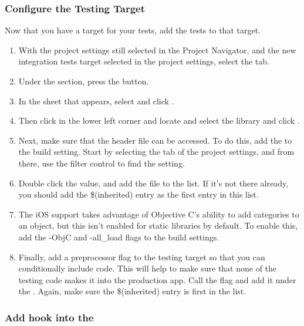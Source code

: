 \subsubsection{Configure the Testing Target}

Now that you have a target for your tests, add the tests to that target. 
\begin{enumerate}
\item  With the project settings still selected in the Project Navigator, and the new integration tests target selected in the project settings, select the  tab. 
\item Under the  section, press the \bxcaption{+} button. 
\item In the sheet that appears, select  and click .
\item Then click  in the lower left corner and locate and select the library  and click .
\item Next, make sure that the   header file can be accessed. To do this, add the  to the  
build setting. Start by selecting the  tab of the project settings, and from there, use the filter control to find the 
 setting. 
\item Double click the value, and add the file  to the list. If it's not there already, you should 
add the \$(inherited) entry as the first entry in this list.
\item  The iOS support takes advantage of Objective C's ability to add categories to an object, but this isn't enabled for static libraries by default. 
To enable this, add the -ObjC and -all\_load flags to the  build settings.
\item Finally, add a preprocessor flag to the testing target so that you can conditionally include code. This will help to make sure that none of the 
testing code makes it into the production app. Call the flag  and add it under the . Again, make 
sure the \$(inherited) entry is first in the list.
\end{enumerate}

\subsubsection{Add hook into the \gdaut{}}

